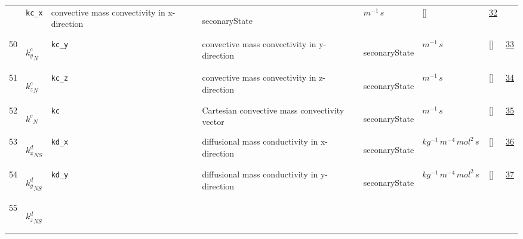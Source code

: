 \begin{longtable}{|p{1cm}|p{3cm}|p{3cm}|p{7cm}|p{3.0cm}|p{3cm}|p{2cm}|p{1cm}|}
             & \verb|kc_x|
             & convective mass convectivity in x-direction
             & \begin{lay}seconaryState \end{lay}
             & $ m^{-1} \,s \, $
             & []
             & \hyperlink{"e:32"}{ 32 }
                 \\
    50
             & \hypertarget{"v:50"}{ $ {k^{c}_{y}}_{N} $}
             & \verb|kc_y|
             & convective mass convectivity in y-direction
             & \begin{lay}seconaryState \end{lay}
             & $ m^{-1} \,s \, $
             & []
             & \hyperlink{"e:33"}{ 33 }
                 \\
    51
             & \hypertarget{"v:51"}{ $ {k^{c}_{z}}_{N} $}
             & \verb|kc_z|
             & convective mass convectivity in z-direction
             & \begin{lay}seconaryState \end{lay}
             & $ m^{-1} \,s \, $
             & []
             & \hyperlink{"e:34"}{ 34 }
                 \\
    52
             & \hypertarget{"v:52"}{ $ {k^{c}}_{N} $}
             & \verb|kc|
             & Cartesian convective mass convectivity vector
             & \begin{lay}seconaryState \end{lay}
             & $ m^{-1} \,s \, $
             & []
             & \hyperlink{"e:35"}{ 35 }
                 \\
    53
             & \hypertarget{"v:53"}{ $ {k^{d}_{x}}_{{N S}} $}
             & \verb|kd_x|
             & diffusional mass conductivity in x-direction
             & \begin{lay}seconaryState \end{lay}
             & $ kg^{-1} \,m^{-4} \,mol^{2} \,s \, $
             & []
             & \hyperlink{"e:36"}{ 36 }
                 \\
    54
             & \hypertarget{"v:54"}{ $ {k^{d}_{y}}_{{N S}} $}
             & \verb|kd_y|
             & diffusional mass conductivity in y-direction
             & \begin{lay}seconaryState \end{lay}
             & $ kg^{-1} \,m^{-4} \,mol^{2} \,s \, $
             & []
             & \hyperlink{"e:37"}{ 37 }
                 \\
    55
             & \hypertarget{"v:55"}{ $ {k^{d}_{z}}_{{N S}} $}

\end{longtable}
